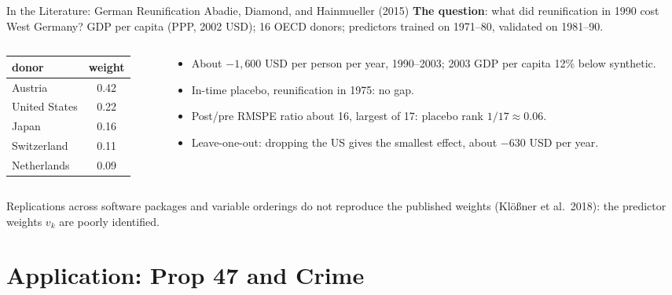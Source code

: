 \documentclass[aspectratio=169,11pt,xcolor=dvipsnames]{beamer}
\newcommand{\srcp}[1]{{\scriptsize\color{gray}(#1)}}
\newcommand{\srct}[1]{#1}
\begin{document}
\begin{frame}{In the Literature: German Reunification}
\vskip-2pt{\footnotesize\color{gray}\srct{Abadie, Diamond, and Hainmueller (2015)}}\vskip1pt
\textbf{The question}: what did reunification in 1990 cost West Germany?
GDP per capita (PPP, 2002 USD); 16 OECD donors; predictors trained on
1971--80, validated on 1981--90.
\begin{columns}[T]
\begin{column}{0.44\linewidth}
\begin{center}\footnotesize
\renewcommand{\arraystretch}{1.0}
\begin{tabular}{@{}lc@{}}
\toprule
donor & weight \\
\midrule
Austria & 0.42 \\
United States & 0.22 \\
Japan & 0.16 \\
Switzerland & 0.11 \\
Netherlands & 0.09 \\
\bottomrule
\end{tabular}
\end{center}
\end{column}
\begin{column}{0.54\linewidth}
\footnotesize
\begin{itemize}\itemsep1pt
  \item About $-1{,}600$ USD per person per year, 1990--2003; 2003 GDP per capita
        12\% below synthetic.
  \item In-time placebo, reunification in 1975: no gap.
  \item Post/pre RMSPE ratio about 16, largest of 17: placebo rank $1/17 \approx 0.06$.
  \item Leave-one-out: dropping the US gives the smallest effect, about $-630$
        USD per year.
\end{itemize}
\end{column}
\end{columns}
\vskip3pt
{\footnotesize Replications across software packages and variable orderings do not
reproduce the published weights \srcp{Klößner et al.\ 2018}: the predictor weights $v_k$ are poorly identified.}
\end{frame}

\section[Prop 47]{Application: Prop 47 and Crime}
\begin{frame}\sectionpage\end{frame}
\end{document}
